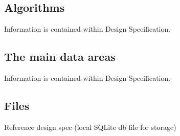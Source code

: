 \documentclass{project}
\begin{document}
\subsection{Algorithms}
Information is contained within Design Specification\cite{se.qa.ds}.

\subsection{The main data areas}
Information is contained within Design Specification\cite{se.qa.ds}.

\subsection{Files}
Reference design spec (local SQLite db file for storage)
\end{document}
